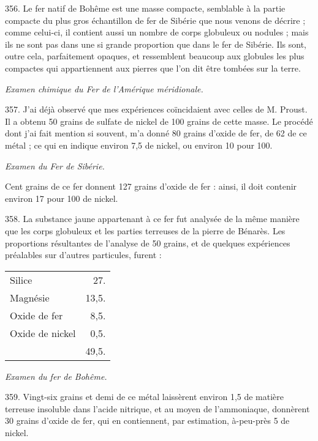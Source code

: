 \documentclass[a4paper, 11pt, oneside, polutonikogreek, french]{article}
\begin{document}
356. Le fer natif de Bohême est une masse compacte, semblable à la partie compacte du plus gros échantillon de fer de Sibérie que nous venons de décrire ; comme celui-ci, il contient aussi un nombre de corps globuleux ou nodules ; mais ils ne sont pas dans une si grande proportion que dans le fer de Sibérie. Ils sont, outre cela, parfaitement opaques, et ressemblent beaucoup aux globules les plus compactes qui appartiennent aux pierres que l'on dit être tombées sur la terre.

\begin{center}
\emph{Examen chimique du Fer de l'Amérique méridionale.}
\end{center}

357. J'ai déjà observé que mes expériences coïncidaient avec celles de M. Proust. Il a obtenu 50 grains de sulfate de nickel de 100 grains de cette masse. Le procédé dont j'ai fait mention si souvent, m'a donné 80 grains d'oxide de fer, de 62 de ce métal ; ce qui en indique environ 7,5 de nickel, ou environ 10 pour 100.

\begin{center}
\emph{Examen du Fer de Sibérie.}
\end{center}

Cent grains de ce fer donnent 127 grains d'oxide de fer : ainsi, il doit contenir environ 17 pour 100 de nickel.

358. La substance jaune appartenant à ce fer fut analysée de la même manière que les corps globuleux et les parties terreuses de la pierre de Bénarès. Les proportions résultantes de l'analyse de 50 grains, et de quelques expériences préalables sur d'autres particules, furent :

\begin{table}[!ht]
    \centering
    \Fontauri
    \Large
    \begin{tabular}{l r}
        Silice & 27. \\
        Magnésie & 13,5. \\
        Oxide de fer & 8,5. \\
        Oxide de nickel & 0,5. \\ \hline
        ~ & 49,5. \\
    \end{tabular}
\end{table}

\begin{center}
\emph{Examen du fer de Bohême.}
\end{center}

359. Vingt-six grains et demi de ce métal laissèrent environ 1,5 de matière terreuse insoluble dans l'acide nitrique, et au moyen de l'ammoniaque, donnèrent 30 grains d'oxide de fer, qui en contiennent, par estimation, à-peu-près 5 de nickel.
\end{document}
